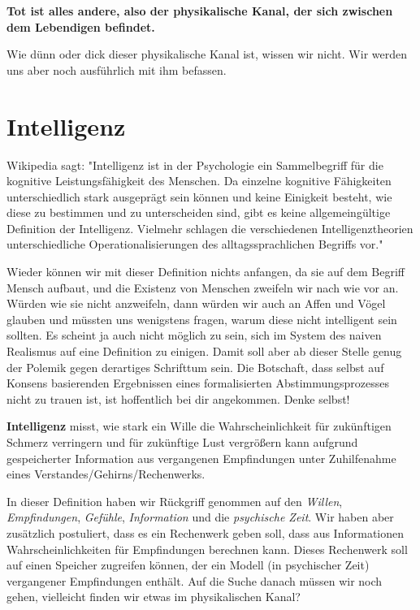 \documentclass[12pt]{book}
\begin{document}
\textbf{Tot ist alles andere, also der physikalische Kanal, der sich zwischen dem Lebendigen befindet.}

Wie dünn oder dick dieser physikalische Kanal ist, wissen wir nicht. Wir werden uns aber noch ausführlich mit ihm befassen.

\section{Intelligenz}

Wikipedia sagt: "Intelligenz ist in der Psychologie ein Sammelbegriff für die kognitive Leistungsfähigkeit des Menschen. Da einzelne kognitive Fähigkeiten unterschiedlich stark ausgeprägt sein können und keine Einigkeit besteht, wie diese zu bestimmen und zu unterscheiden sind, gibt es keine allgemeingültige Definition der Intelligenz. Vielmehr schlagen die verschiedenen Intelligenztheorien unterschiedliche Operationalisierungen des alltagssprachlichen Begriffs vor."

Wieder können wir mit dieser Definition nichts anfangen, da sie auf dem Begriff Mensch aufbaut, und die Existenz von Menschen zweifeln wir nach wie vor an. Würden wie sie nicht anzweifeln, dann würden wir auch an Affen und Vögel glauben und müssten uns wenigstens fragen, warum diese nicht intelligent sein sollten. Es scheint ja auch nicht möglich zu sein, sich im System des naiven Realismus auf eine Definition zu einigen. Damit soll aber ab dieser Stelle genug der Polemik gegen derartiges Schrifttum sein. Die Botschaft, dass selbst auf Konsens basierenden Ergebnissen eines formalisierten Abstimmungsprozesses nicht zu trauen ist, ist hoffentlich bei dir angekommen. Denke selbst! 

\textbf{Intelligenz} misst, wie stark ein Wille die Wahrscheinlichkeit für zukünftigen Schmerz verringern und für zukünftige Lust vergrößern kann aufgrund gespeicherter Information aus vergangenen Empfindungen unter Zuhilfenahme eines Verstandes/Gehirns/Rechenwerks.

In dieser Definition haben wir Rückgriff genommen auf den \emph{Willen}, \emph{Empfindungen}, \emph{Gefühle}, \emph{Information} und die \emph{psychische Zeit}. Wir haben aber zusätzlich postuliert, dass es ein Rechenwerk geben soll, dass aus Informationen Wahrscheinlichkeiten für Empfindungen berechnen kann. Dieses Rechenwerk soll auf einen Speicher zugreifen können, der ein Modell (in psychischer Zeit) vergangener Empfindungen enthält. Auf die Suche danach müssen wir noch gehen, vielleicht finden wir etwas im physikalischen Kanal?
\end{document}
